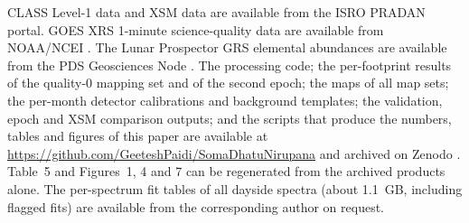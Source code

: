 CLASS Level-1 data \citep{CLASSdata} and XSM data \citep{XSMdata} are available from the ISRO PRADAN portal. GOES XRS 1-minute science-quality data are available from NOAA/NCEI \citep{GOESdata}. The Lunar Prospector GRS elemental abundances are available from the PDS Geosciences Node \citep{PrettymanPDS2012}. The processing code; the per-footprint results of the quality-0 mapping set and of the second epoch; the maps of all map sets; the per-month detector calibrations and background templates; the validation, epoch and XSM comparison outputs; and the scripts that produce the numbers, tables and figures of this paper are available at \url{https://github.com/GeeteshPaidi/SomaDhatuNirupana} and archived on Zenodo \citep{SomaDhatu}. Table~5 and Figures~1, 4 and 7 can be regenerated from the archived products alone. The per-spectrum fit tables of all dayside spectra (about \SI{1.1}{GB}, including flagged fits) are available from the corresponding author on request.
